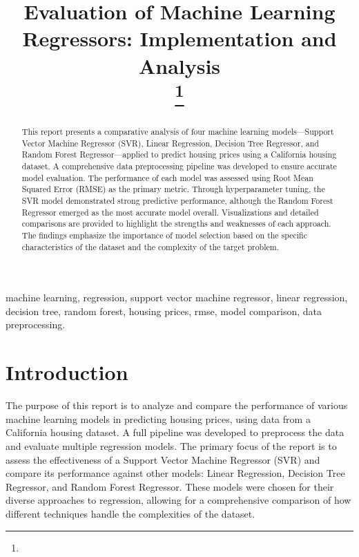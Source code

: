 \documentclass[conference]{IEEEtran}
\begin{document}
\title{Evaluation of Machine Learning Regressors: Implementation and Analysis\\

\thanks{}
}

\author{

}

\maketitle

\begin{abstract}
This report presents a comparative analysis of four machine learning models—Support Vector Machine Regressor (SVR), Linear Regression, Decision Tree Regressor, and Random Forest Regressor—applied to predict housing prices using a California housing dataset. A comprehensive data preprocessing pipeline was developed to ensure accurate model evaluation. The performance of each model was assessed using Root Mean Squared Error (RMSE) as the primary metric. Through hyperparameter tuning, the SVR model demonstrated strong predictive performance, although the Random Forest Regressor emerged as the most accurate model overall. Visualizations and detailed comparisons are provided to highlight the strengths and weaknesses of each approach. The findings emphasize the importance of model selection based on the specific characteristics of the dataset and the complexity of the target problem.
\end{abstract}

\begin{IEEEkeywords}
machine learning, regression, support vector machine regressor, linear regression, decision tree, random forest, housing prices, rmse, model comparison, data preprocessing.
\end{IEEEkeywords}

\section{Introduction}
The purpose of this report is to analyze and compare the performance of various machine learning models in predicting housing prices, using data from a California housing dataset. A full pipeline was developed to preprocess the data and evaluate multiple regression models. The primary focus of the report is to assess the effectiveness of a Support Vector Machine Regressor (SVR) and compare its performance against other models: Linear Regression, Decision Tree Regressor, and Random Forest Regressor. These models were chosen for their diverse approaches to regression, allowing for a comprehensive comparison of how different techniques handle the complexities of the dataset.
\end{document}
